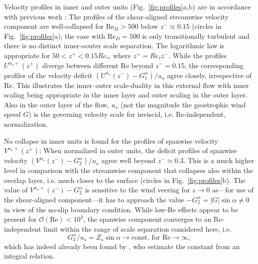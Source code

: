 \documentclass[a4paper,11pt]{amsart}
\newcommand{\todo}[1]{\textcolor{red}{$[$#1$]$}}
\newcommand{\RE}{\mathrm{Re}}
\begin{document}
%
\par
%
Velocity profiles in inner and outer units (Fig.~\ref{fig:profiles}a,b) are in accordance
with previous work \citep{coleman:JFM1992,spalart:PF2008,spalart:PF2009,ansorge:BM2014,ansorge:BM2019}:
%
The profiles of the shear-aligned streamwise velocity component are well-collapsed for $\RE_D>500$
below $z^-\approx 0.15$ (circles in Fig.~\ref{fig:profiles}a); the case with $\RE_D=500$ is only transitionally
turbulent and there is no distinct inner-oouter scale separation.
The logarithmic law is appropriate for $50 < z^+ < 0.15 Re_\tau$, where $z^+ = Re_\tau z^-$.
%
While the profiles $U^{\alpha_\star+}(z^+)$ diverge between different $\RE$ beyond $z^-=0.15$,
the corresponding profiles of the velocity deficit  $(U^{\alpha_\star}(z^-) - G_{1}^{\alpha} ) /u_\star$
agree closely, irrespective of $\RE$.
%
This illustrates the inner--outer scale-duality in this external flow with inner scaling being
appropriate in the inner layer and outer scaling in the outer layer. 
%
Also in the outer layer of the flow, $u_\star$ (not the magnitude the
geostrophic wind speed $G$) is the governing velocity scale for inviscid, i.e. $\RE$-independent,
normalization.
%
\par
%
No collapse in inner units is found for the profiles of spanwise velocity $V^{\alpha_\star+}(z^+)$;
%
When normalized in outer units, the deficit profiles of spanwise velocity
$(V^{\alpha_\star}(z^-)-G_{2}^{\alpha})/u_\star$
agree well beyond $z^-\approx 0.3$. %
This is a much higher level in comparison with the streamwise component that collapses
also within the overlap layer, i.e. much closer to the surface
(circles in Fig.~\ref{fig:profiles}b).
%
The value of $V^{\alpha_\star+}(z^-)-G_{2}^{\alpha}$ is sensitive to the wind veering for
$z\rightarrow 0$ as---for use of the shear-aligned component---it has to approach the value
$-G_2^\alpha=|G|\sin\alpha\ne0$ in view of the no-slip boundary condition.  
%
While low-$\RE$ effects appear to be present for $\mathcal{O}(\RE)<10^3$, the spanwise component
converges to an $\RE$-independent limit within the range of scale separation considered
here, i.e.
\begin{equation}
  G_{2}^{\alpha}/u_\star = Z_\star \sin\alpha \rightarrow \text{const. for\ }\RE\rightarrow \infty, 
\end{equation}
which has indeed already been found by \cite{spalart:JFM1989}, who estimate the constant from
an integral relation. 
%
\par
%
\end{document}
